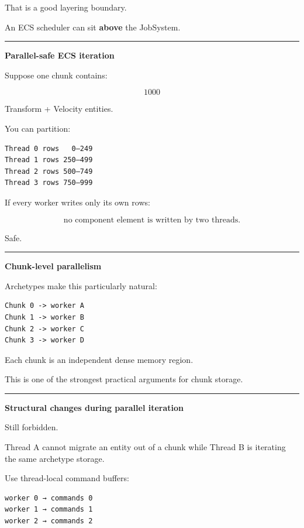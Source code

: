 That is a good layering boundary.

An ECS scheduler can sit \textbf{above} the JobSystem.

\begin{center}\rule{0.5\linewidth}{0.5pt}\end{center}

\textbf{Parallel-safe ECS iteration}

Suppose one chunk contains:

\[
1000
\]

Transform + Velocity entities.

You can partition:

\begin{verbatim}
Thread 0 rows   0–249
Thread 1 rows 250–499
Thread 2 rows 500–749
Thread 3 rows 750–999
\end{verbatim}

If every worker writes only its own rows:

\[
\text{no component element is written by two threads}.
\]

Safe.

\begin{center}\rule{0.5\linewidth}{0.5pt}\end{center}

\textbf{Chunk-level parallelism}

Archetypes make this particularly natural:

\begin{verbatim}
Chunk 0 -> worker A
Chunk 1 -> worker B
Chunk 2 -> worker C
Chunk 3 -> worker D
\end{verbatim}

Each chunk is an independent dense memory region.

This is one of the strongest practical arguments for chunk storage.

\begin{center}\rule{0.5\linewidth}{0.5pt}\end{center}

\textbf{Structural changes during parallel iteration}

Still forbidden.

Thread A cannot migrate an entity out of a chunk while Thread B is iterating the same archetype storage.

Use thread-local command buffers:

\begin{verbatim}
worker 0 → commands 0
worker 1 → commands 1
worker 2 → commands 2
\end{verbatim}

